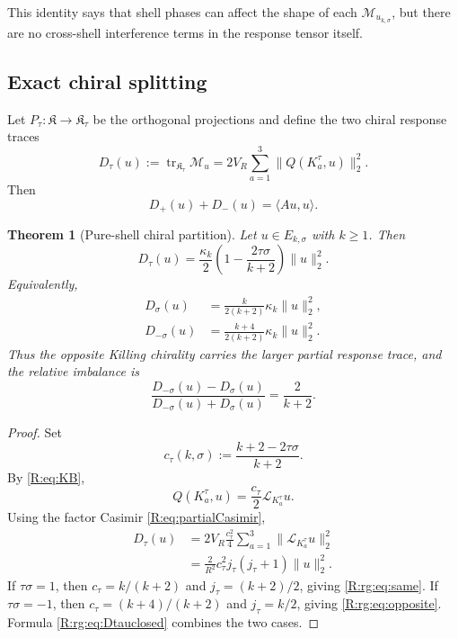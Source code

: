 \documentclass[
 aps,
 prd,
 reprint,
 amsmath,
 amssymb,
 nofootinbib,
 superscriptaddress
]{revtex4-2}
\newtheorem{theorem}{Theorem}[section]
\theoremstyle{definition}
\theoremstyle{remark}
\newcommand{\cM}{\mathscr M}
\newcommand{\tr}{\operatorname{tr}}
\begin{document}
This identity says that shell phases can affect the shape of each
$\cM_{u_{k,\sigma}}$, but there are no cross-shell interference terms in
the response tensor itself.

\subsection{Exact chiral splitting}

Let $P_\tau:\mathfrak K\to\mathfrak K_\tau$ be the orthogonal projections and
define the two chiral response traces
\begin{equation}
 D_\tau(u)
 :=
 \tr_{\mathfrak K_\tau}\cM_u
 =
 2V_R\sum_{a=1}^3
 \|Q(K_a^\tau,u)\|_2^2.
 \label{R:rg:eq:Dtau}
\end{equation}
Then
\begin{equation}
       D_+(u)+D_-(u)=\langle Au,u\rangle.
 \label{R:rg:eq:Dsum}
\end{equation}

\begin{theorem}[Pure-shell chiral partition]
\label{R:rg:thm:pureshellsplit}
Let $u\in E_{k,\sigma}$ with $k\ge1$.  Then
\begin{equation}
 \boxed{
 D_\tau(u)
 =
 \frac{\kappa_k}{2}
 \left(
 1-\frac{2\tau\sigma}{k+2}
 \right)
 \|u\|_2^2.
 }
 \label{R:rg:eq:Dtauclosed}
\end{equation}
Equivalently,
\begin{align}
 D_\sigma(u)
 &=
 \frac{k}{2(k+2)}
 \kappa_k\|u\|_2^2,
 \label{R:rg:eq:same}\\
 D_{-\sigma}(u)
 &=
 \frac{k+4}{2(k+2)}
 \kappa_k\|u\|_2^2.
 \label{R:rg:eq:opposite}
\end{align}
Thus the opposite Killing chirality carries the larger partial response
trace, and the relative imbalance is
\begin{equation}
 \frac{
 D_{-\sigma}(u)-D_{\sigma}(u)
 }{
 D_{-\sigma}(u)+D_{\sigma}(u)
 }
 =
 \frac{2}{k+2}.
 \label{R:rg:eq:pureshellbias}
\end{equation}
\end{theorem}

\begin{proof}
Set
\[
 c_\tau(k,\sigma)
 :=
 \frac{k+2-2\tau\sigma}{k+2}.
\]
By \eqref{R:eq:KB},
\[
 Q(K_a^\tau,u)
 =
 \frac{c_\tau}{2}\mathcal L_{K_a^\tau}u.
\]
Using the factor Casimir \eqref{R:eq:partialCasimir},
\begin{align*}
 D_\tau(u)
 &=
 2V_R
 \frac{c_\tau^2}{4}
 \sum_{a=1}^3
 \|\mathcal L_{K_a^\tau}u\|_2^2\\
 &=
 \frac{2}{R^2}
 c_\tau^2
 j_\tau(j_\tau+1)
 \|u\|_2^2.
\end{align*}
If $\tau\sigma=1$, then
$c_\tau=k/(k+2)$ and $j_\tau=(k+2)/2$, giving
\eqref{R:rg:eq:same}.  If $\tau\sigma=-1$, then
$c_\tau=(k+4)/(k+2)$ and $j_\tau=k/2$, giving
\eqref{R:rg:eq:opposite}.  Formula \eqref{R:rg:eq:Dtauclosed} combines the two cases.
\end{proof}
\end{document}
